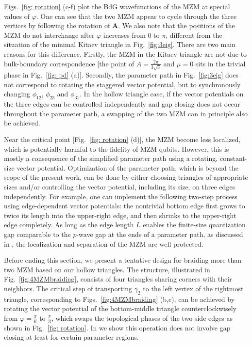 \documentclass[aps,prb,twocolumn,showpacs,amsmath,amssymb,superscriptaddress]{revtex4-2}
\begin{document}
Figs.~\ref{fig: rotation} (c-f) plot the BdG wavefunctions of the MZM at special values of $\varphi$. One can see that the two MZM appear to cycle through the three vertices by following the rotation of $\mathbf A$. We also note that the positions of the MZM do not interchange after $\varphi$ increases from 0 to $\pi$, different from the situation of the minimal Kitaev triangle in Fig.~\ref{fig:3eig}. There are two main reasons for this difference. Firstly, the MZM in the Kitaev triangle are not due to bulk-boundary correspondence [the point of $A = \frac{2\pi}{3\sqrt{3}}$ and $\mu=0$ sits in the trivial phase in Fig.~\ref{fig: pd} (a)]. Secondly, the parameter path in Fig.~\ref{fig:3eig} does not correspond to rotating the staggered vector potential, but to synchronously changing $\phi_{12}$, $\phi_{23}$ and $\phi_{31}$. In the hollow triangle case, if the vector potentials on the three edges can be controlled independently and gap closing does not occur throughout the parameter path, a swapping of the two MZM can in principle also be achieved.

Near the critical point [Fig.~\ref{fig: rotation} (d)], the MZM become less localized, which is potentially harmful to the fidelity of MZM qubits. However, this is mostly a consequence of the simplified parameter path using a rotating, constant-size vector potential. Optimization of the parameter path, which is beyond the scope of the present work, can be done by either choosing triangles of appropriate sizes and/or controlling the vector potential, including its size, on three edges independently. For example, one can implement the following two-step process using edge-dependent vector potentials: the nontrivial bottom edge first grows to twice its length into the upper-right edge, and then shrinks to the upper-right edge completely. As long as the edge length $L$ enables the finite-size quantization gap comparable to the $p$-wave gap at the ends of a parameter path, as discussed in \cite{aliceaNonAbelianStatisticsTopological2011}, the localization and separation of the MZM are well protected.

Before ending this section, we present a tentative design for braiding more than two MZM based on our hollow triangles. The structure, illustrated in Fig.~\ref{fig:4MZMbraiding}, consists of four triangles sharing corners with their neighbors. The critical step of transporting $\gamma_2$ to the left vertex of the rightmost triangle, corresponding to Figs.~\ref{fig:4MZMbraiding} (b,c), can be achieved by rotating the vector potential of the bottom-middle triangle counterclockwisely from $\varphi = \frac{\pi}{6}$ to $\frac{\pi}{3}$, which swaps the topological phases of the two side edges as shown in Fig.~\ref{fig: rotation}. In \cite{supp} we show this operation does not involve gap closing at least for certain parameter regions.
\end{document}
